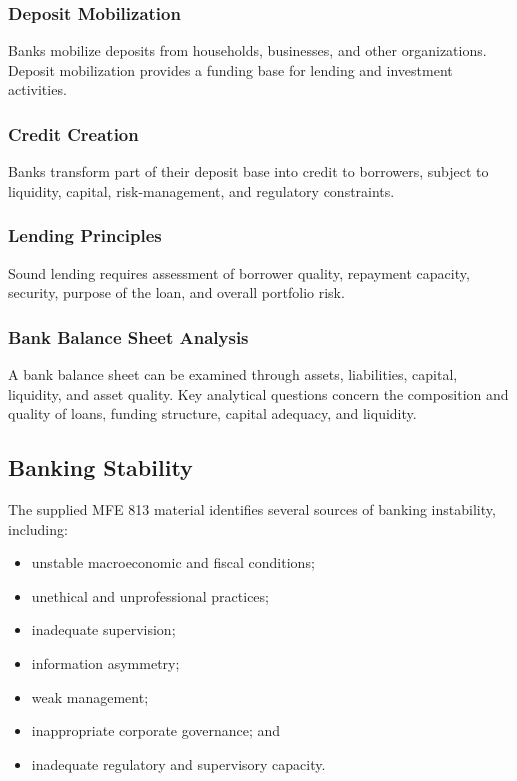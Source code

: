 \documentclass[
]{article}
\providecommand{\tightlist}{%
  \setlength{\itemsep}{0pt}\setlength{\parskip}{0pt}}
\begin{document}
\subsubsection{Deposit Mobilization}\label{deposit-mobilization}

Banks mobilize deposits from households, businesses, and other organizations. Deposit mobilization provides a funding base for lending and investment activities.

\subsubsection{Credit Creation}\label{credit-creation}

Banks transform part of their deposit base into credit to borrowers, subject to liquidity, capital, risk-management, and regulatory constraints.

\subsubsection{Lending Principles}\label{lending-principles}

Sound lending requires assessment of borrower quality, repayment capacity, security, purpose of the loan, and overall portfolio risk.

\subsubsection{Bank Balance Sheet Analysis}\label{bank-balance-sheet-analysis}

A bank balance sheet can be examined through assets, liabilities, capital, liquidity, and asset quality. Key analytical questions concern the composition and quality of loans, funding structure, capital adequacy, and liquidity.

\subsection{Banking Stability}\label{banking-stability}

The supplied MFE 813 material identifies several sources of banking instability, including:

\begin{itemize}
\tightlist
\item
  unstable macroeconomic and fiscal conditions;
\item
  unethical and unprofessional practices;
\item
  inadequate supervision;
\item
  information asymmetry;
\item
  weak management;
\item
  inappropriate corporate governance; and
\item
  inadequate regulatory and supervisory capacity.
\end{itemize}
\end{document}
